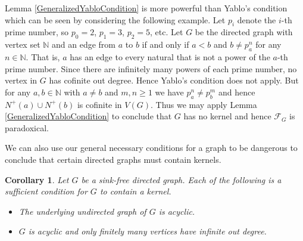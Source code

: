 \documentclass[12pt]{kluwer}
\newtheorem{cor}[thm]{Corollary}
\theoremstyle{remark}
\newcommand{\fancy}[1]{\mathcal{#1}}
\def\F{\fancy{F}}
\def\F{\fancy{F}}
\begin{document}
Lemma \ref{GeneralizedYabloCondition} is more powerful than Yablo's condition which can be seen by considering the following example.  Let $p_i$ denote the $i$-th prime number, so $p_0 = 2$, $p_1 = 3$, $p_2 = 5$, etc.  Let $G$ be the directed graph with vertex set $\mathbb{N}$ and an edge from $a$ to $b$ if and only if $a < b$ and $b \neq p_a^n$ for any $n \in \mathbb{N}$.  That is, $a$ has an edge to every natural that is not a power of the $a$-th prime number.  Since there are infinitely many powers of each prime number, no vertex in $G$ has cofinite out degree.  Hence Yablo's condition does not apply.  But for any $a, b \in \mathbb{N}$ with $a \neq b$ and $m, n \geq 1$ we have $p_a^n \neq p_b^m$ and hence $N^+(a) \cup N^+(b)$ is cofinite in $V(G)$.  Thus we may apply Lemma \ref{GeneralizedYabloCondition} to conclude that $G$ has no kernel and hence $\F_G$ is paradoxical.

We can also use our general necessary conditions for a graph to be dangerous to conclude that certain directed graphs must contain kernels.

\begin{cor}
Let $G$ be a sink-free directed graph.  Each of the following is a sufficient condition for $G$ to contain a kernel.
\begin{itemize}
\item The underlying undirected graph of $G$ is acyclic.
\item $G$ is acyclic and only finitely many vertices have infinite out degree.
\end{itemize}
\end{cor}






\end{document}
